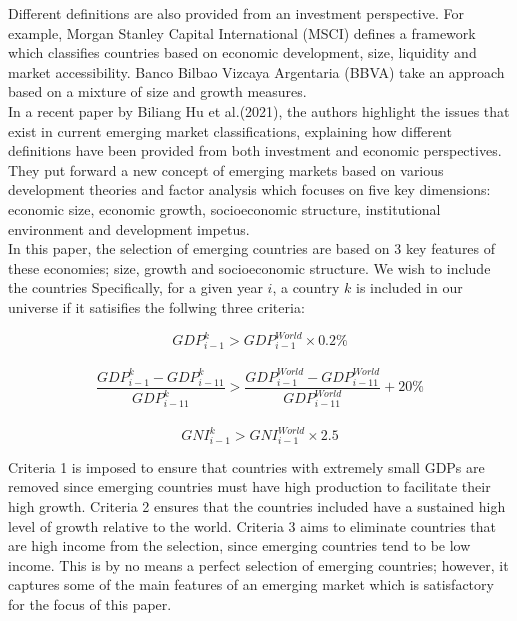 \documentclass{article}
\begin{document}
Different definitions are also provided from an investment perspective. For example, Morgan Stanley Capital International (MSCI) defines a framework which classifies countries based on economic development, size, liquidity and market accessibility. Banco Bilbao Vizcaya Argentaria (BBVA) take an approach based on a mixture of size and growth measures.\\

In a recent paper by Biliang Hu et al.(2021), the authors highlight the issues that exist in current emerging market classifications, explaining how different definitions have been provided from both investment and economic perspectives. They put forward a new concept of emerging markets based on various development theories and factor analysis which focuses on five key dimensions: economic size, economic growth, socioeconomic structure, institutional environment and development impetus.\\

In this paper, the selection of emerging countries are based on 3 key features of these economies; size, growth and socioeconomic structure. We wish to include the countries Specifically, for a given year $i$, a country $k$ is included in our universe if it satisifies the follwing three criteria: 

\begin{equation}
    GDP^k_{i-1} > GDP^{World}_{i-1} \times 0.2\%
\end{equation}
\\
\begin{equation}
    \frac{GDP^k_{i-1}-GDP^k_{i-11}}{GDP^k_{i-11}} > \frac{GDP^{World}_{i-1}-GDP^{World}_{i-11}}{GDP^{World}_{i-11}} + 20\%
\end{equation}
\\
\begin{equation}
    GNI^k_{i-1} > GNI^{World}_{i-1} \times 2.5
\end{equation}

Criteria 1 is imposed to ensure that countries with extremely small GDPs are removed since emerging countries must have high production to facilitate their high growth. Criteria 2 ensures that the countries included have a sustained high level of growth relative to the world. Criteria 3 aims to eliminate countries that are high income from the selection, since emerging countries tend to be low income. This is by no means a perfect selection of emerging countries; however, it captures some of the main features of an emerging market which is satisfactory for the focus of this paper. 
\end{document}
